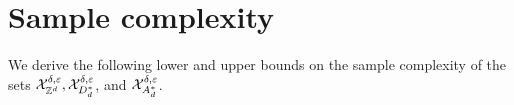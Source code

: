 \section{Sample complexity}\label{sec:sample_complexity}
We derive the following lower and upper bounds on the sample complexity of the sets $\XZ,\XD$, and $\XA$. %




